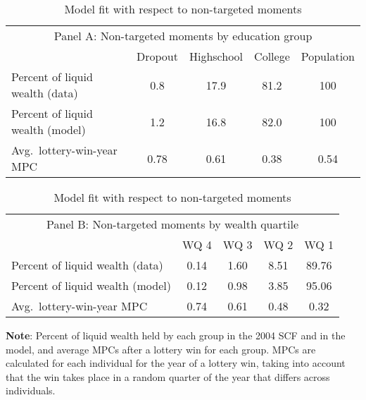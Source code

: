 \documentclass{econsocart}
\begin{document}
\begin{table}[tb] 
  \caption{Model fit with respect to non-targeted moments}
  \label{tab:nonTargetedMoments} 
  \centering

  \centering
  \begin{tabular}{lcccc}
    \multicolumn{5}{c}{\small Panel A: Non-targeted moments by education group}    \\
    \addlinespace
    \hline
                                     & Dropout & Highschool & College & Population \\
    \hline
    Percent of liquid wealth (data)  & 0.8     & 17.9       & 81.2    & 100        \\
    Percent of liquid wealth (model) & 1.2     & 16.8       & 82.0    & 100        \\
    \hline
    Avg.\ lottery-win-year MPC       & 0.78    & 0.61       & 0.38    & 0.54       \\
    \hline
  \end{tabular}

  \vspace{0.5em}

  \centering
  \begin{tabular}{lcccc}
    \multicolumn{5}{c}{\small Panel B: Non-targeted moments by wealth quartile} \\
    \addlinespace
    \hline
                                     & WQ 4 & WQ 3 & WQ 2 & WQ 1                \\
    \hline
    Percent of liquid wealth (data)  & 0.14 & 1.60 & 8.51 & 89.76               \\
    Percent of liquid wealth (model) & 0.12 & 0.98 & 3.85 & 95.06               \\
    \hline
    Avg.\ lottery-win-year MPC       & 0.74 & 0.61 & 0.48 & 0.32                \\
    \hline
  \end{tabular}

  \vspace{0.5em}
  \noindent\parbox{\textwidth}{\footnotesize
    \textbf{Note}: Percent of liquid wealth held by each group in the 2004 SCF and in the model, and average MPCs after a lottery win for each group. MPCs are calculated for each individual for the year of a lottery win, taking into account that the win takes place in a random quarter of the year that differs across individuals.}

  \vspace{0.5em}

\end{table}
\end{document}
